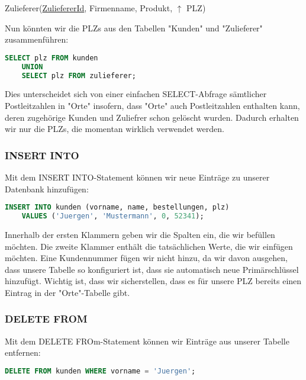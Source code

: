 \documentclass{article}
\begin{document}
	\begin{center}
		Zulieferer(\underline{ZuliefererId}, Firmenname, Produkt, $\uparrow$ PLZ) \\
	\end{center}

	Nun könnten wir die PLZs aus den Tabellen "Kunden" und "Zulieferer" zusammenführen:

	\begin{lstlisting}[language=SQL, caption=Wir sammeln sämtliche momentan benutzten PLZs in unserer Datenbank ein]
	SELECT plz FROM kunden
	UNION
	SELECT plz FROM zulieferer;
	\end{lstlisting}

	Dies unterscheidet sich von einer einfachen SELECT-Abfrage sämtlicher Postleitzahlen in "Orte" insofern, dass "Orte" auch Postleitzahlen enthalten kann, deren zugehörige Kunden und Zuliefrer schon gelöscht wurden. Dadurch erhalten wir nur die PLZs, die momentan wirklich verwendet werden.

	\subsubsection{INSERT INTO}
	Mit dem INSERT INTO-Statement können wir neue Einträge zu unserer Datenbank hinzufügen:

	\begin{lstlisting}[language=SQL, caption=Wir fügen neue Einträge zu der Kunden-Tabelle hinzu]
	INSERT INTO kunden (vorname, name, bestellungen, plz) 
	VALUES ('Juergen', 'Mustermann', 0, 52341);
	\end{lstlisting}

	Innerhalb der ersten Klammern geben wir die Spalten ein, die wir befüllen möchten. Die zweite Klammer enthält die tatsächlichen Werte, die wir einfügen möchten. Eine Kundennummer fügen wir nicht hinzu, da wir davon ausgehen, dass unsere Tabelle so konfiguriert ist, dass sie automatisch neue Primärschlüssel hinzufügt. Wichtig ist, dass wir sicherstellen, dass es für unsere PLZ bereits einen Eintrag in der "Orte"-Tabelle gibt.

	\subsubsection{DELETE FROM}
	Mit dem DELETE FROm-Statement können wir Einträge aus unserer Tabelle entfernen:

	\begin{lstlisting}[language=SQL, caption=Wir entfernen alle Jürgens aus unserer Kundentabelle]
	DELETE FROM kunden WHERE vorname = 'Juergen';
	\end{lstlisting}
\end{document}

